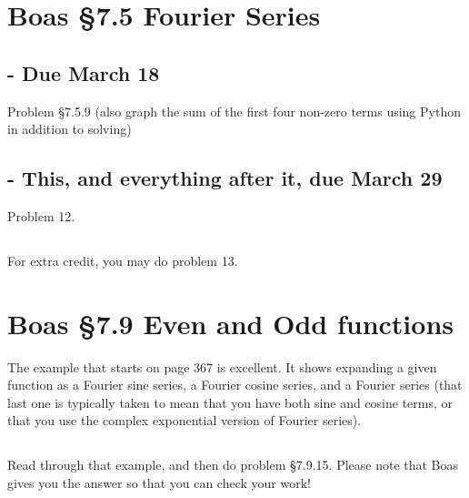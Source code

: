 \documentclass[12pt]{article}
\begin{document}

\section{Boas \S7.5 Fourier Series}

\subsection{ - Due March 18}
Problem \S7.5.9 (also graph the sum of the first four non-zero terms using Python in
addition to solving)

\subsection{ - This, and everything after it, due March 29}
Problem 12.

\subsection{}
For extra credit, you may do problem 13.

\section{Boas \S7.9 Even and Odd functions}

The example that starts on page 367 is excellent. It shows expanding a
given function as a Fourier sine series, a Fourier cosine series, and
a Fourier series (that last one is typically taken to mean that you
have both sine and cosine terms, or that you use the complex
exponential version of Fourier series).

\subsection{} Read through that example, and then do
problem \S7.9.15. Please note that Boas gives you the answer so that
you can check your work!
\end{document}
